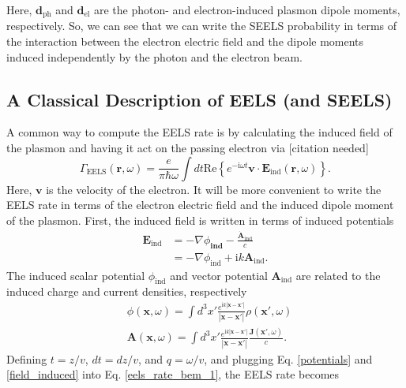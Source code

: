 \documentclass [11pt, proquest] {uwthesis}[2016/11/22]
\begin{document}
Here, $\textbf{d}_{\textrm{ph}}$ and $\textbf{d}_{\textrm{el}}$ are the photon- and electron-induced plasmon dipole moments, respectively. So, we can see that we can write the SEELS probability in terms of the interaction between the electron electric field and the dipole moments induced independently by the photon and the electron beam.


\subsection{A Classical Description of EELS (and SEELS)}

A common way to compute the EELS rate is by calculating the induced field of the plasmon and having it act on the passing electron via [citation needed]
\begin{equation}
\Gamma_{\textrm{EELS}}(\textbf{r},\omega) = \frac{e}{\pi\hbar\omega}\int dt \textrm{Re}\left\{ e^{-\textrm{i}\omega t} \textbf{v} \cdot \textbf{E}_{\textrm{ind}}(\textbf{r},\omega)\right\}.
\label{eels_rate_bem_1}
\end{equation}
Here, $\textbf{v}$ is the velocity of the electron. It will be more convenient to write the EELS rate in terms of the electron electric field and the induced dipole moment of the plasmon. First, the induced field is written in terms of induced potentials
\begin{equation}
\begin{aligned}
\textbf{E}_{\textrm{ind}} &= -\nabla\phi_{\textbf{ind}} - \frac{\dot{\textbf{A}}_{\textrm{ind}}}{c}\\
&= -\nabla\phi_{\textrm{ind}} + \textrm{i}k\textbf{A}_{\textrm{ind}}.
\label{field_induced}
\end{aligned}
\end{equation}
The induced scalar potential $\phi_{\textrm{ind}}$ and vector potential $\textbf{A}_{\textrm{ind}}$ are related to the induced charge and current densities, respectively
\begin{equation}
\begin{aligned}
&\phi(\textbf{x},\omega) = \int d^3x' \frac{e^{\textrm{i}k|\textbf{x}-\textbf{x}'|}}{|\textbf{x}-\textbf{x}'|}\rho(\textbf{x}',\omega)\\
&\textbf{A}(\textbf{x},\omega) = \int d^3x' \frac{e^{\textrm{i}k|\textbf{x}-\textbf{x}'|}}{|\textbf{x}-\textbf{x}'|}\frac{\textbf{J}(\textbf{x}',\omega)}{c}.
\label{potentials}
\end{aligned}
\end{equation}
Defining $t = z/v$, $dt = dz/v$, and $q = \omega/v$, and plugging Eq. \ref{potentials} and \ref{field_induced} into Eq. \ref{eels_rate_bem_1}, the EELS rate becomes
\end{document}
